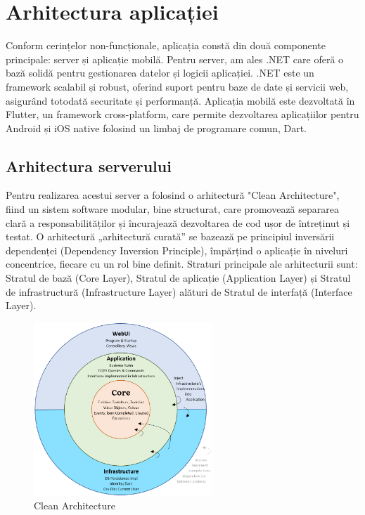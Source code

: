 \chapter{Arhitectura aplicației}

Conform cerințelor non-funcționale, aplicația constă din două componente principale: server și aplicație mobilă. Pentru server, am ales .NET care oferă o bază solidă pentru gestionarea datelor și logicii aplicației. .NET este un framework scalabil și robust, oferind suport pentru baze de date și servicii web, asigurând totodată securitate și performanță. Aplicația mobilă este dezvoltată în Flutter, un framework cross-platform, care permite dezvoltarea aplicațiilor pentru Android și iOS native folosind un limbaj de programare comun, Dart.

\section{Arhitectura serverului}

Pentru realizarea acestui server a folosind o arhitectură "Clean Architecture", fiind un sistem software modular, bine structurat, care promovează separarea clară a responsabilităților și încurajează dezvoltarea de cod ușor de întreținut și testat.
O arhitectură „arhitectură curată” se bazează pe principiul inversării dependenței (Dependency Inversion Principle), împărțind o aplicație în niveluri concentrice, fiecare cu un rol bine definit. Straturi principale ale arhitecturii sunt: Stratul de bază (Core Layer), Stratul de aplicație (Application Layer) și Stratul de infrastructură (Infrastructure Layer) alături de Stratul de interfață (Interface Layer).

\begin{figure}[ht]
    \centering
    \includegraphics[width=0.6\textwidth] {images/clean_architecture.png}
    \caption{Clean Architecture}
    \label{fig:clean_architecture}
\end{figure}

